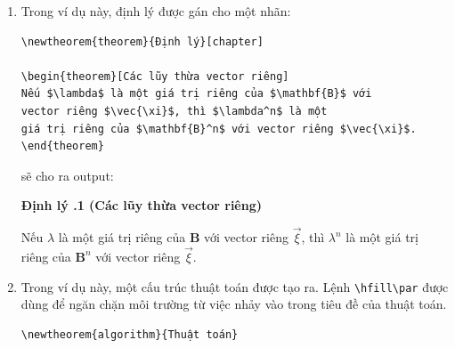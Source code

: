 \documentclass[a4paper]{report}
\begin{document}
\begin{enumerate}
\item Trong ví dụ này, định lý được gán cho một nhãn:
\begin{code}
\begin{verbatim}
\newtheorem{theorem}{Định lý}[chapter]

\begin{theorem}[Các lũy thừa vector riêng]
Nếu $\lambda$ là một giá trị riêng của $\mathbf{B}$ với 
vector riêng $\vec{\xi}$, thì $\lambda^n$ là một 
giá trị riêng của $\mathbf{B}^n$ với vector riêng $\vec{\xi}$.
\end{theorem}
\end{verbatim}
\end{code}%
sẽ cho ra output:
\begin{result}
\textbf{Định lý \thechapter.1 (Các lũy thừa vector riêng)}
\begin{itshape}
Nếu $\lambda$ là một giá trị riêng của $\mathbf{B}$ với vector riêng  $\vec{\xi}$, thì
$\lambda^n$ là một giá trị riêng của $\mathbf{B}^n$ với vector riêng $\vec{\xi}$.
\end{itshape}
\end{result}

\item Trong ví dụ này, một cấu trúc thuật toán được tạo ra. Lệnh \verb|\hfill\par| được dùng để ngăn chặn môi trường  từ việc nhảy vào trong tiêu đề của thuật toán.

\begin{code}
\begin{verbatim}
\newtheorem{algorithm}{Thuật toán}


\end{verbatim}
\end{code}
\end{enumerate}
\end{document}

